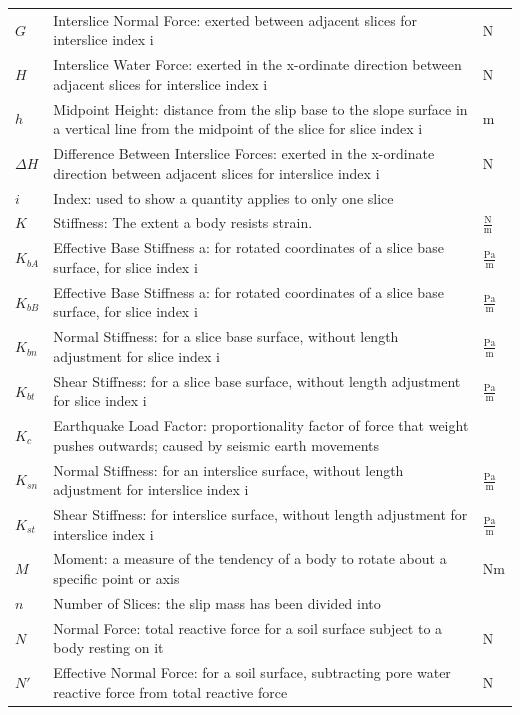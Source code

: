 \documentclass[12pt]{article}
\begin{document}
\begin{longtabu}{l X[l] l}
\\
$G$ & Interslice Normal Force: exerted between adjacent slices for interslice index i & N
\\
$H$ & Interslice Water Force: exerted in the x-ordinate direction between adjacent slices for interslice index i & N
\\
$h$ & Midpoint Height: distance from the slip base to the slope surface in a vertical line from the midpoint of the slice for slice index i & m
\\
$ΔH$ & Difference Between Interslice Forces: exerted in the x-ordinate direction between adjacent slices for interslice index i & N
\\
$i$ & Index: used to show a quantity applies to only one slice & 
\\
$K$ & Stiffness: The extent a body resists strain. & $\frac{\text{N}}{\text{m}}$
\\
${K_{bA}}$ & Effective Base Stiffness a: for rotated coordinates of a slice base surface, for slice index i & $\frac{\text{Pa}}{\text{m}}$
\\
${K_{bB}}$ & Effective Base Stiffness a: for rotated coordinates of a slice base surface, for slice index i & $\frac{\text{Pa}}{\text{m}}$
\\
${K_{bn}}$ & Normal Stiffness: for a slice base surface, without length adjustment for slice index i & $\frac{\text{Pa}}{\text{m}}$
\\
${K_{bt}}$ & Shear Stiffness: for a slice base surface, without length adjustment for slice index i & $\frac{\text{Pa}}{\text{m}}$
\\
${K_{c}}$ & Earthquake Load Factor: proportionality factor of force that weight pushes outwards; caused by seismic earth movements & 
\\
${K_{sn}}$ & Normal Stiffness: for an interslice surface, without length adjustment for interslice index i & $\frac{\text{Pa}}{\text{m}}$
\\
${K_{st}}$ & Shear Stiffness: for interslice surface, without length adjustment for interslice index i & $\frac{\text{Pa}}{\text{m}}$
\\
$M$ & Moment: a measure of the tendency of a body to rotate about a specific point or axis & Nm
\\
$n$ & Number of Slices: the slip mass has been divided into & 
\\
$N$ & Normal Force: total reactive force for a soil surface subject to a body resting on it & N
\\
$N'$ & Effective Normal Force: for a soil surface, subtracting pore water reactive force from total reactive force & N

\end{longtabu}
\end{document}
